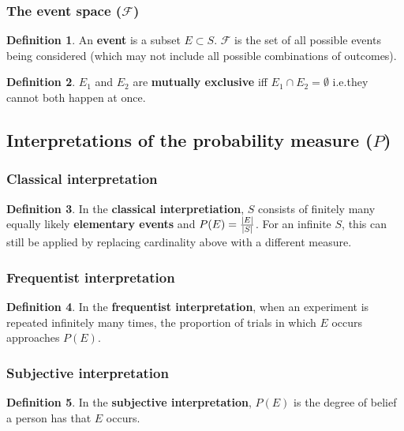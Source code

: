 \documentclass[12pt]{article}
\theoremstyle{definition}
\newtheorem*{defn*}{Definition}
\DeclarePairedDelimiter\abs{\lvert}{\rvert}
\newcommand{\F}{\mathcal{F}}
\begin{document}
\subsubsection{The event space ($\F$)}

\begin{defn*}
  An \textbf{event} is a subset $E \subset S$.
  $\F$ is the set of all possible events being considered (which may not include all possible combinations of outcomes).
\end{defn*}

\begin{defn*}
  $E_1$ and $E_2$ are \textbf{mutually exclusive} iff $E_1 \cap E_2 = \emptyset$ i.e.\@ they cannot both happen at once.
\end{defn*}

\subsection{Interpretations of the probability measure ($P$)}

\subsubsection{Classical interpretation}

\begin{defn*}
  In the \textbf{classical interpretiation}, $S$ consists of finitely many equally likely \textbf{elementary events} and $P(E) = \frac{\abs{E}}{\abs{S}}$.
  For an infinite $S$, this can still be applied by replacing cardinality above with a different measure.
\end{defn*}

\subsubsection{Frequentist interpretation}

\begin{defn*}
  In the \textbf{frequentist interpretation}, when an experiment is repeated infinitely many times, the proportion of trials in which $E$ occurs approaches $P(E)$.
\end{defn*}

\subsubsection{Subjective interpretation}

\begin{defn*}
  In the \textbf{subjective interpretation}, $P(E)$ is the degree of belief a person has that $E$ occurs.
\end{defn*}
\end{document}
